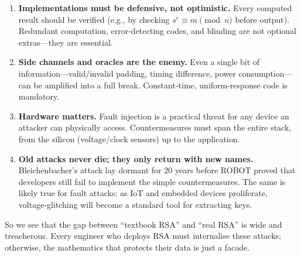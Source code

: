 \begin{enumerate}
    \item \textbf{Implementations must be defensive, not optimistic.}
    Every computed result should be verified (e.g., by checking \(s^e \equiv m \pmod{n}\) before output). Redundant computation, error‑detecting codes, and blinding are not optional extras---they are essential.

    \item \textbf{Side channels and oracles are the enemy.}
    Even a single bit of information---valid/invalid padding, timing difference, power consumption---can be amplified into a full break. Constant‑time, uniform‑response code is mandatory.

    \item \textbf{Hardware matters.}
    Fault injection is a practical threat for any device an attacker can physically access. Countermeasures must span the entire stack, from the silicon (voltage/clock sensors) up to the application.

    \item \textbf{Old attacks never die; they only return with new names.}
    Bleichenbacher's attack lay dormant for 20 years before ROBOT proved that developers still fail to implement the simple countermeasures. The same is likely true for fault attacks: as IoT and embedded devices proliferate, voltage‑glitching will become a standard tool for extracting keys.
\end{enumerate}

So we see that the gap between ``textbook RSA'' and ``real RSA'' is wide and treacherous. Every engineer who deploys RSA must internalise these attacks; otherwise, the mathematics that protects their data is just a facade.